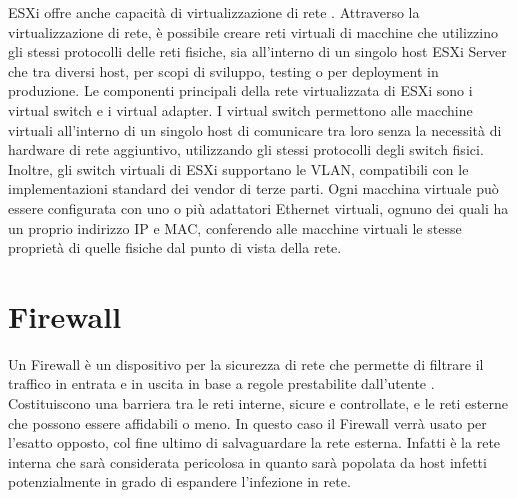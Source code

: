 ESXi offre anche  capacità di virtualizzazione di rete \cite{esxiVirtualNetwork}.
Attraverso la virtualizzazione di rete, è possibile creare reti virtuali di macchine che utilizzino gli stessi protocolli delle reti fisiche, sia all'interno di un singolo host ESXi Server che tra diversi host, per scopi di sviluppo, testing o per deployment in produzione. 
Le componenti principali della rete virtualizzata di ESXi sono i virtual switch e i virtual adapter.
I virtual switch permettono alle macchine virtuali all'interno di un singolo host di comunicare tra loro senza la necessità di hardware di rete aggiuntivo, utilizzando gli stessi protocolli degli switch fisici. Inoltre, gli switch virtuali di ESXi  supportano le VLAN, compatibili con le implementazioni standard dei vendor di terze parti.  Ogni macchina virtuale può essere configurata con uno o più adattatori Ethernet virtuali, ognuno dei quali ha un proprio indirizzo IP e MAC, conferendo alle macchine virtuali le stesse proprietà di quelle fisiche dal punto di vista della rete.


\section{Firewall}
\label{firewall}
Un Firewall è un dispositivo per la sicurezza di rete che permette di filtrare il traffico in entrata e in uscita in base a regole prestabilite dall'utente \cite{krit2017overview}.
Costituiscono una barriera tra le reti interne, sicure e controllate, e le reti esterne che possono essere affidabili o meno. 
In questo caso il Firewall verrà usato per l'esatto opposto, col fine ultimo di salvaguardare la rete esterna. Infatti è la rete interna che sarà considerata pericolosa in quanto sarà popolata da host infetti potenzialmente in grado di espandere l'infezione in rete.

